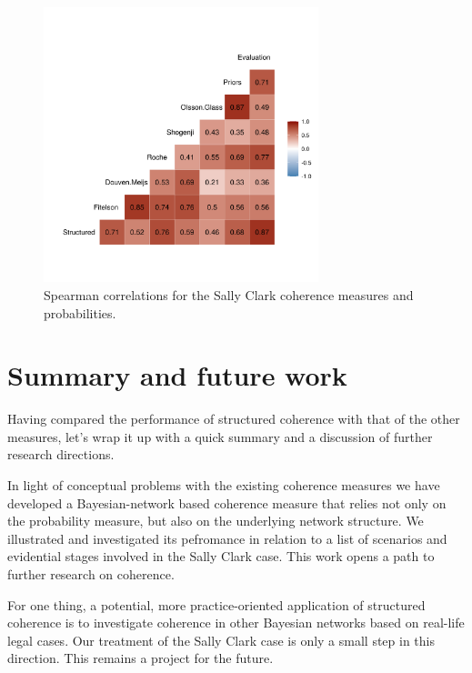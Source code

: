 \documentclass[10pt,]{scrartcl}
\begin{document}
\begin{figure}[H]\centering
    \includegraphics[width = 8cm]{../images/scSpearman.png}
    \caption{Spearman correlations for the Sally Clark coherence measures and probabilities.}
    \label{fig:spearman}
\end{figure}



\section{Summary and future work}\label{sec:discussion}




Having compared the performance of structured coherence with that of the other measures, let's wrap it up with a quick summary and a discussion of further research directions. 





In light of conceptual problems with the existing coherence measures we have developed a Bayesian-network based coherence measure that relies not only on the probability measure, but also on the underlying network structure.   We illustrated  and investigated its pefromance in relation to a list of scenarios and evidential stages involved in the Sally Clark case. This work  opens a path to further research on coherence.


For one thing, a potential, more practice-oriented  application of structured coherence is to investigate coherence in other Bayesian networks based on real-life legal cases. Our treatment of the Sally Clark case is only a small step in this direction. This remains a project for the future.



\end{document}
